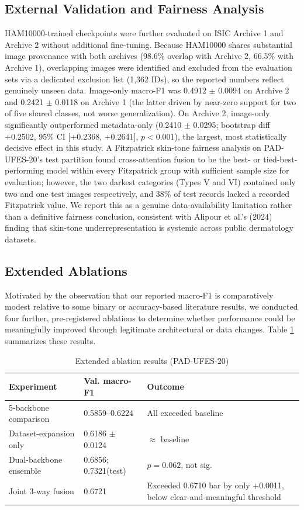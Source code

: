 \documentclass[conference]{IEEEtran}
\begin{document}
\subsection{External Validation and Fairness Analysis}
HAM10000-trained checkpoints were further evaluated on ISIC Archive 1 and Archive 2 without additional fine-tuning. Because HAM10000 shares substantial image provenance with both archives (98.6\% overlap with Archive 2, 66.5\% with Archive 1), overlapping images were identified and excluded from the evaluation sets via a dedicated exclusion list (1,362 IDs), so the reported numbers reflect genuinely unseen data. Image-only macro-F1 was 0.4912 $\pm$ 0.0094 on Archive 2 and 0.2421 $\pm$ 0.0118 on Archive 1 (the latter driven by near-zero support for two of five shared classes, not worse generalization). On Archive 2, image-only significantly outperformed metadata-only (0.2410 $\pm$ 0.0295; bootstrap diff +0.2502, 95\% CI [+0.2368, +0.2641], $p<0.001$), the largest, most statistically decisive effect in this study. A Fitzpatrick skin-tone fairness analysis on PAD-UFES-20's test partition found cross-attention fusion to be the best- or tied-best-performing model within every Fitzpatrick group with sufficient sample size for evaluation; however, the two darkest categories (Types V and VI) contained only two and one test images respectively, and 38\% of test records lacked a recorded Fitzpatrick value. We report this as a genuine data-availability limitation rather than a definitive fairness conclusion, consistent with Alipour et al.'s (2024) finding that skin-tone underrepresentation is systemic across public dermatology datasets.

\subsection{Extended Ablations}
Motivated by the observation that our reported macro-F1 is comparatively modest relative to some binary or accuracy-based literature results, we conducted four further, pre-registered ablations to determine whether performance could be meaningfully improved through legitimate architectural or data changes. Table \ref{tab:ablations} summarizes these results.

\begin{table}[t]
\caption{Extended ablation results (PAD-UFES-20)}
\label{tab:ablations}
\centering
\scriptsize
\begin{tabular}{|p{2.6cm}|p{1.9cm}|p{2.1cm}|}
\hline
\textbf{Experiment} & \textbf{Val. macro-F1} & \textbf{Outcome} \\
\hline
5-backbone comparison & 0.5859--0.6224 & All exceeded baseline \\
\hline
Dataset-expansion only & 0.6186 $\pm$ 0.0124 & $\approx$ baseline \\
\hline
Dual-backbone ensemble & 0.6856; 0.7321(test) & $p=0.062$, not sig. \\
\hline
Joint 3-way fusion & 0.6721 & Exceeded 0.6710 bar by only +0.0011, below clear-and-meaningful threshold \\
\hline
\end{tabular}
\end{table}
\end{document}
